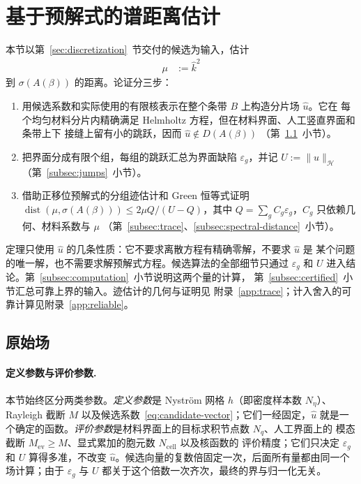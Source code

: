 \section{基于预解式的谱距离估计}
\label{sec:error}

本节以第~\ref{sec:discretization}~节交付的候选为输入，估计
\begin{align}
  \mu&:=\widehat k^2
  \label{eq:candidate-mu}
\end{align}
到 $\sigma(A(\beta))$ 的距离。论证分三步：
\begin{enumerate}
  \item 用候选系数和实际使用的有限核表示在整个条带 $B$ 上构造分片场 $\widehat u$。它在
    每个均匀材料分片内精确满足 Helmholtz 方程，但在材料界面、人工竖直界面和条带上下
    接缝上留有小的跳跃，因而 $\widehat u\notin D(A(\beta))$
    （第~\ref{subsec:raw-field}~小节）。
  \item 把界面分成有限个组，每组的跳跃汇总为界面缺陷 $\varepsilon_g$，并记
    $U:=\lVert\widehat u\rVert_{\mathcal H}$（第~\ref{subsec:jumps}~小节）。
  \item 借助正移位预解式的分组迹估计和 Green 恒等式证明
    $\operatorname{dist}(\mu,\sigma(A(\beta)))\leq2\mu Q/(U-Q)$，其中
    $Q=\sum_gC_g\varepsilon_g$，$C_g$ 只依赖几何、材料系数与 $\mu$
    （第~\ref{subsec:trace}、\ref{subsec:spectral-distance}~小节）。
\end{enumerate}
定理只使用 $\widehat u$ 的几条性质：它不要求离散方程有精确零解，不要求 $\widehat u$ 是
某个问题的唯一解，也不需要求解预解式方程。候选算法的全部细节只通过 $\varepsilon_g$ 和
$U$ 进入结论。第~\ref{subsec:computation}~小节说明这两个量的计算，
第~\ref{subsec:certified}~小节汇总可靠上界的输入。迹估计的几何与证明见
附录~\ref{app:trace}；计入舍入的可靠计算见附录~\ref{app:reliable}。



\subsection{原始场}
\label{subsec:raw-field}

\paragraph{定义参数与评价参数.}
本节始终区分两类参数。\emph{定义参数}是 Nystr\"om 网格 $h$（即密度样本数 $N_\eta$）、
Rayleigh 截断 $M$ 以及候选系数~\eqref{eq:candidate-vector}；它们一经固定，$\widehat u$
就是一个确定的函数。\emph{评价参数}是材料界面上的目标求积节点数 $N_q$、人工界面上的
模态截断 $M_{\mathrm{ev}}\geq M$、显式累加的胞元数 $N_{\mathrm{cell}}$ 以及核函数的
评价精度；它们只决定 $\varepsilon_g$ 和 $U$ 算得多准，不改变
$\widehat u$。候选向量的复数倍固定一次，后面所有量都由同一个场计算；由于
$\varepsilon_g$ 与 $U$ 都关于这个倍数一次齐次，最终的界与归一化无关。

